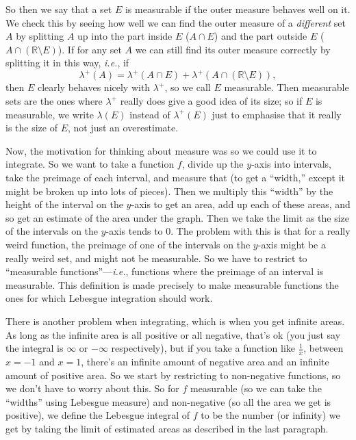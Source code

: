 \documentclass{article}
\let\take\setminus
\begin{document}
So then we say that a set $E$ is measurable if the outer measure behaves well on it. We check this by seeing how well we can find the outer measure of a \textit{different} set $A$ by splitting $A$ up into the part inside $E$ ($A\cap E$) and the part outside $E$ ($A\cap(\mathbb{R}\take E)$). If for any set $A$ we can still find its outer measure correctly by splitting it in this way, \textit{i.e.}, if
\[\lambda^+(A)=\lambda^+(A\cap E)+\lambda^+(A\cap(\mathbb{R}\take E)),\]
then $E$ clearly behaves nicely with $\lambda^+$, so we call $E$ measurable. Then measurable sets are the ones where $\lambda^+$ really does give a good idea of its size; so if $E$ is measurable, we write $\lambda(E)$ instead of $\lambda^+(E)$ just to emphasise that it really is the size of $E$, not just an overestimate.\bigskip

Now, the motivation for thinking about measure was so we could use it to integrate. So we want to take a function $f$, divide up the $y$-axis into intervals, take the preimage of each interval, and measure that (to get a ``width,'' except it might be broken up into lots of pieces). Then we multiply this ``width'' by the height of the interval on the $y$-axis to get an area, add up each of these areas, and so get an estimate of the area under the graph. Then we take the limit as the size of the intervals on the $y$-axis tends to 0. The problem with this is that for a really weird function, the preimage of one of the intervals on the $y$-axis might be a really weird set, and might not be measurable. So we have to restrict to ``measurable functions''---\textit{i.e.}, functions where the preimage of an interval is measurable. This definition is made precisely to make measurable functions the ones for which Lebesgue integration should work.

There is another problem when integrating, which is when you get infinite areas. As long as the infinite area is all positive or all negative, that's ok (you just say the integral is $\infty$ or $-\infty$ respectively), but if you take a function like $\frac{1}{x}$, between $x=-1$ and $x=1$, there's an infinite amount of negative area and an infinite amount of positive area. So we start by restricting to non-negative functions, so we don't have to worry about this. So for $f$ measurable (so we can take the ``widths'' using Lebesgue measure) and non-negative (so all the area we get is positive), we define the Lebesgue integral of $f$ to be the number (or infinity) we get by taking the limit of estimated areas as described in the last paragraph.
\end{document}
